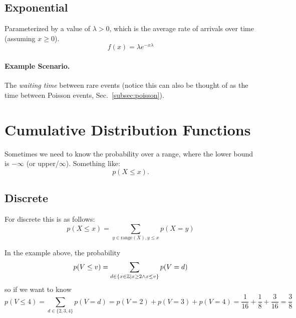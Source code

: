 \subsection{Exponential}
Parameterized by a value of $\lambda>0$, which is the average rate of arrivals over time 
(assuming $x\ge 0$).
\[f(x) = \lambda e^{-x\lambda}\]

\paragraph{Example Scenario.} The \emph{waiting time} between rare events 
(notice this can also be thought of as the time between Poisson events, Sec.~\ref{subsec:poisson}).


\begin{center}
\end{center}

\section{Cumulative Distribution Functions}
Sometimes we need to know the probability over a range, where the lower bound is $-\infty$ (or upper/$\infty$). 
Something like: 
\[p(X\le x).\]

\subsection{Discrete}
For discrete this is as follows: 
\[p(X\le x) = \sum_{y \in \text{range}(X),y\le x} p(X=y)\] %

In the example above, the probability 
\[p(V\le v) = \sum_{d \in \left\{x \in \operatorname{\mathbb{Z}} \mid x \ge 2 \wedge x \le v\right\}}p(V=d)\]
so if we want to know
\[p(V\le 4) = \sum_{d\in\{2,3,4\}} p(V=d) = p(V=2) + p(V=3) + p(V=4) = \frac{1}{16} + \frac{1}{8} + \frac{3}{16} = \frac{3}{8}\]

